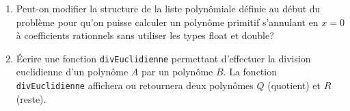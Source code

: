 \documentclass[a4paper]{article}
\begin{document}
\begin{enumerate}
\item Peut-on modifier la structure de la liste polynômiale définie au début du problème pour qu'on puisse calculer un polynôme primitif s'annulant en $x=0$ à coefficients rationnels sans utiliser les types float et double?
\item Écrire une fonction {\tt divEuclidienne} permettant d'effectuer la division euclidienne d'un polynôme $A$ par un polynôme $B$. La fonction {\tt divEuclidienne}  affichera ou retournera deux polynômes $Q$ (quotient) et $R$ (reste).
\end{enumerate}
\end{document}
